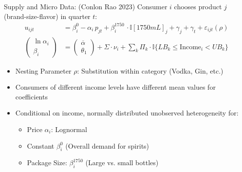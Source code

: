 \begin{frame}{Supply and Micro Data: (Conlon Rao 2023)}
Consumer $i$ chooses product $j$ (brand-size-flavor) in quarter $t$:
\begin{align*}
u_{ijt} &= \beta_{i}^0 -  \alpha_i\, p_{jt} + \beta_i^{1750}\, \cdot \mathbb{I}[1750mL]_j + \gamma_j + \gamma_t+ \varepsilon_{ijt}(\rho)\\
\begin{pmatrix}
\ln \alpha_i\\
\beta_i
\end{pmatrix} &=
\begin{pmatrix}
\overline{\alpha}\\
\theta_1
\end{pmatrix} + \Sigma \cdot \nu_i + \sum_{k} \Pi_k \cdot \mathbb{I}\{LB_k \leq \text{Income}_i < UB_k\} 
\end{align*}
\begin{itemize}
\item Nesting Parameter $\rho$: Substitution within category (Vodka, Gin, etc.) %
\item Consumers of different income levels have different mean values for coefficients
\item Conditional on income, normally distributed unobserved heterogeneity for:
\begin{itemize}
\item Price $\alpha_i$: \alert{Lognormal}
\item Constant $\beta_{i}^0$ (Overall demand for spirits)
\item Package Size: $\beta_{i}^{1750}$ (Large vs. small bottles)
\end{itemize}
\end{itemize}
\end{frame}


